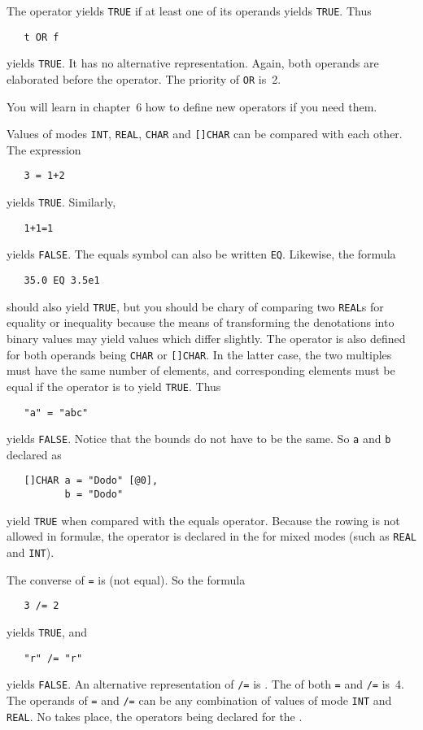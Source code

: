 The operator  yields \verb|TRUE| if at least one of its
operands yields \verb|TRUE|. Thus
\begin{verbatim}
   t OR f
\end{verbatim}
\noindent
yields \verb|TRUE|. It has no alternative representation. Again, both
operands are elaborated before the operator. The priority of
\verb|OR| is~2.

You will learn in chapter~6 how to define new operators if you need
them.

Values of modes \verb|INT|, \verb|REAL|, \verb|CHAR| and
\verb|[]CHAR| can be compared with each other.  The expression
\begin{verbatim}
   3 = 1+2
\end{verbatim}
\noindent
yields \verb|TRUE|.  Similarly,
\begin{verbatim}
   1+1=1
\end{verbatim}
\noindent
yields \verb|FALSE|.  The equals symbol \ixtt{=} can also be written
\verb|EQ|. Likewise, the formula
\begin{verbatim}
   35.0 EQ 3.5e1
\end{verbatim}
\noindent
should also yield \verb|TRUE|, but you should be chary of comparing
two \verb|REAL|s for equality or inequality because the means of
transforming the denotations into binary values may yield values
which differ slightly.  The operator is also defined for both
operands being \verb|CHAR| or \verb|[]CHAR|.  In the latter case, the
two multiples must have the same number of elements, and
corresponding elements must be equal if the operator is to yield
\verb|TRUE|.  Thus
\begin{verbatim}
   "a" = "abc"
\end{verbatim}
\noindent
yields \verb|FALSE|. Notice that the bounds do not have to be the
same.  So \verb|a| and \verb|b| declared as
\begin{verbatim}
   []CHAR a = "Dodo" [@0],
          b = "Dodo"
\end{verbatim}
\noindent
yield \verb|TRUE| when compared with the equals operator.  Because
the rowing  is not allowed in
formul{\ae}, the operator is declared in the 
for mixed modes (such as \verb|REAL| and \verb|INT|).

The converse of \verb|=| is \ixtt{/=} (not equal). So the formula
\begin{verbatim}
   3 /= 2
\end{verbatim}
\noindent
yields \verb|TRUE|, and
\begin{verbatim}
   "r" /= "r"
\end{verbatim}
\noindent
yields \verb|FALSE|.  An alternative representation of \verb|/=| is
.  The  of both \verb|=| and \verb|/=| is~4.
The operands of \verb|=| and \verb|/=| can be any combination of
values of mode \verb|INT| and \verb|REAL|.  No
 takes place, the operators being
declared for the .

